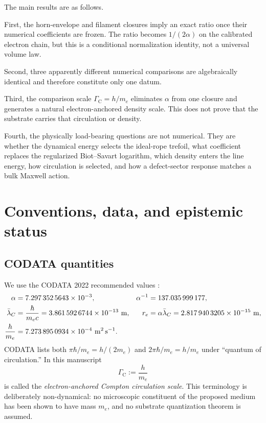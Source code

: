 \documentclass[aps,pre,preprint,notitlepage,nofootinbib,superscriptaddress]{revtex4-2}
\newcommand{\lC}{\bar\lambda_C}
\newcommand{\re}{r_e}
\newcommand{\GammaC}{\Gamma_{\mathrm C}}
\begin{document}
The main results are as follows.

First, the horn-envelope and filament closures imply an exact ratio once their numerical coefficients are frozen.  The ratio becomes \(1/(2\alpha)\) on the calibrated electron chain, but this is a conditional normalization identity, not a universal volume law.

Second, three apparently different numerical comparisons are algebraically identical and therefore constitute only one datum.

Third, the comparison scale \(\GammaC=h/m_e\) eliminates \(\alpha\) from one closure and generates a natural electron-anchored density scale.  This does not prove that the substrate carries that circulation or density.

Fourth, the physically load-bearing questions are not numerical.  They are whether the dynamical energy selects the ideal-rope trefoil, what coefficient replaces the regularized Biot--Savart logarithm, which density enters the line energy, how circulation is selected, and how a defect-sector response matches a bulk Maxwell action.

\section{Conventions, data, and epistemic status}
\label{sec:conventions}

\subsection{CODATA quantities}

We use the CODATA 2022 recommended values \cite{CODATA2022}:
\begin{align}
  \alpha &= 7.297\,352\,5643\times10^{-3},
  &
  \alpha^{-1}&=137.035\,999\,177,
  \notag\\
  \lC &= \frac{\hbar}{m_ec}
  =3.861\,592\,6744\times10^{-13}\ \mathrm{m},
  &
  \re &= \alpha\lC
  =2.817\,940\,3205\times10^{-15}\ \mathrm{m},
  \notag\\
  \frac{h}{m_e}
  &=7.273\,895\,0934\times10^{-4}\ \mathrm{m^2\,s^{-1}}.
\end{align}
CODATA lists both \(\pi\hbar/m_e=h/(2m_e)\) and
\(2\pi\hbar/m_e=h/m_e\) under ``quantum of circulation.''  In this manuscript
\[
\GammaC:=\frac{h}{m_e}
\]
is called the \emph{electron-anchored Compton circulation scale}.  This terminology is deliberately non-dynamical: no microscopic constituent of the proposed medium has been shown to have mass \(m_e\), and no substrate quantization theorem is assumed.
\end{document}

